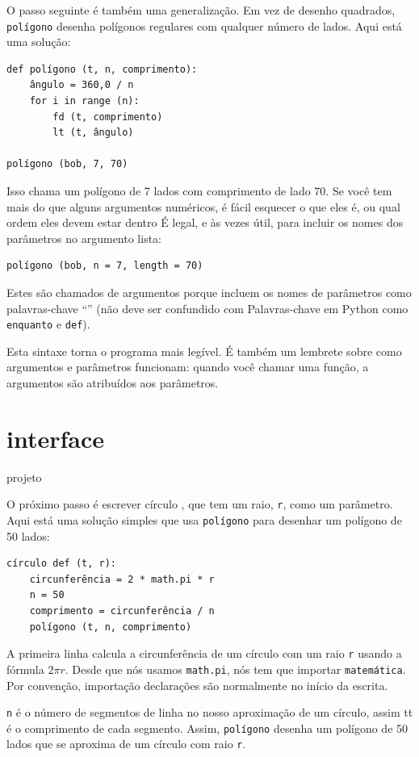 \documentclass[10pt]{book}
\begin{document}
O passo seguinte é também uma generalização. Em vez de desenho
quadrados, {\tt polígono} desenha polígonos regulares com qualquer número de
lados. Aqui está uma solução:

\begin{verbatim}
def polígono (t, n, comprimento):
    ângulo = 360,0 / n
    for i in range (n):
        fd (t, comprimento)
        lt (t, ângulo)

polígono (bob, 7, 70)
\end{verbatim}
%
Isso chama um polígono de 7 lados com comprimento de lado 70. Se você tem
mais do que alguns argumentos numéricos, é fácil esquecer o que eles
é, ou qual ordem eles devem estar dentro É legal, e às vezes
útil, para incluir os nomes dos parâmetros no argumento
lista:

\begin{verbatim}
polígono (bob, n = 7, length = 70)
\end{verbatim}
%
Estes são chamados de argumentos {\bf} porque incluem
os nomes de parâmetros como palavras-chave ``'' (não deve ser confundido com
Palavras-chave em Python como {\tt enquanto} e {\tt def}).

Esta sintaxe torna o programa mais legível. É também um lembrete
sobre como argumentos e parâmetros funcionam: quando você chamar uma função, a
argumentos são atribuídos aos parâmetros.


\section{interface} projeto

O próximo passo é escrever {círculo \tt}, que tem um raio,
{\tt r}, como um parâmetro. Aqui está uma solução simples que usa
{\tt polígono} para desenhar um polígono de 50 lados:

\begin{verbatim}
círculo def (t, r):
    circunferência = 2 * math.pi * r
    n = 50
    comprimento = circunferência / n
    polígono (t, n, comprimento)
\end{verbatim}
%
A primeira linha calcula a circunferência de um círculo com um raio
{\tt r} usando a fórmula $2 \pi r$. Desde que nós usamos {\tt math.pi}, nós
tem que importar {\tt matemática}. Por convenção, {importação \tt} declarações
são normalmente no início da escrita.

{\tt n} é o número de segmentos de linha no nosso aproximação de um círculo,
assim {\comprimento tt} é o comprimento de cada segmento. Assim, {\tt polígono}
desenha um polígono de 50 lados que se aproxima de um círculo com raio {\tt r}.
\end{document}
